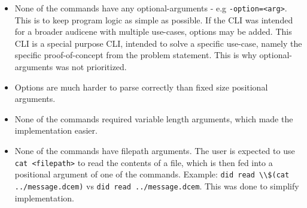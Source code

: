 \begin{itemize}
\tightlist
\item
  None of the commands have any optional-arguments - e.g
  \passthrough{\lstinline!-option=<arg>!}. This is to keep program logic
  as simple as possible. If the CLI was intended for a broader audicene
  with multiple use-cases, options may be added. This CLI is a special
  purpose CLI, intended to solve a specific use-case, namely the
  specific proof-of-concept from the problem statement. This is why
  optional-arguments was not prioritized.
\item
  Options are much harder to parse correctly than fixed size positional
  arguments.
\item
  None of the commands required variable length arguments, which made
  the implementation easier.
\item
  None of the commands have filepath arguments. The user is expected to
  use \passthrough{\lstinline!cat <filepath>!} to read the contents of a
  file, which is then fed into a positional argument of one of the
  commands. Example:
  \passthrough{\lstinline!did read \\\\$(cat ../message.dcem)!} vs
  \passthrough{\lstinline!did read ../message.dcem!}. This was done to
  simplify implementation.
\end{itemize}
